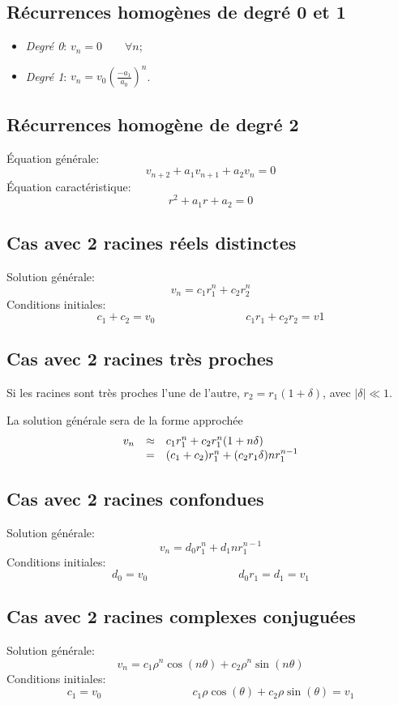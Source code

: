 \subsection{Récurrences homogènes de degré 0 et 1}
\begin{itemize}
  \item \emph{Degré 0}: $v_n = 0 \qquad \forall n$;
  \item \emph{Degré 1}: $v_n = v_0\left (\frac{-a_1}{a_0} \right )^n$.
\end{itemize}

\subsection{Récurrences homogène de degré 2}
Équation générale:
\[ v_{n+2} + a_1v_{n+1} + a_2v_n = 0 \]
Équation caractéristique:
\[ r^2 + a_1r + a_2 = 0 \]

\subsection{Cas avec 2 racines réels distinctes}
Solution générale:
\[ v_n = c_1r_1^n + c_2r_2^n \]
Conditions initiales:
\[ c_1 + c_2 = v_0 \qquad{\qquad{\qquad{\qquad}}} c_1r_1 + c_2r_2 = v1 \]

\subsection{Cas avec 2 racines très proches}
Si les racines sont très proches l'une de l'autre,
$r_2 = r_1(1 + \delta )$, avec $|\delta | \ll 1$.

La solution générale sera de la forme approchée
\[
  \begin{array}{r c l}
    v_n &\approx &c_1r_1^n + c_2r_1^n(1 + n\delta)\\
    &=&(c_1 + c_2)r_1^n + (c_2r_1\delta )nr_1^{n-1}
  \end{array}
\]

\subsection{Cas avec 2 racines confondues}
Solution générale:
\[ v_n = d_0r_1^n + d_1nr_1^{n-1} \]
Conditions initiales:
\[ d_0 = v_0 \qquad{\qquad{\qquad{\qquad}}} d_0r_1 = d_1 = v_1 \]

\subsection{Cas avec 2 racines complexes conjuguées}
Solution générale:
\[ v_n = c_1\rho{^n}\cos{(n\theta)} + c_2\rho{^n}\sin{(n\theta)} \]
Conditions initiales:
\[ c_1 = v_0 \qquad{\qquad{\qquad{\qquad}}}
c_1\rho\cos{(\theta)} + c_2\rho\sin{(\theta)} = v_1 \]


